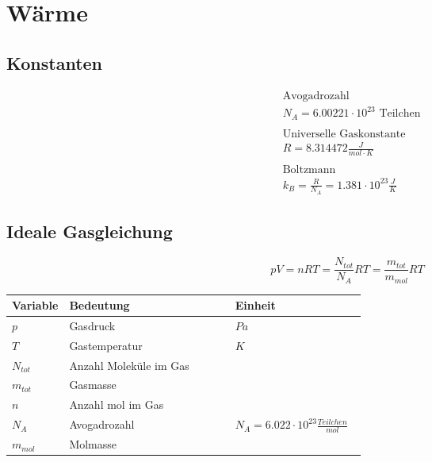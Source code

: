 



\chapter{Wärme}

\section{Konstanten}
\[
\boxed{\begin{aligned}	
		&\text{Avogadrozahl} \\
		&N_{A} = 6.00221 \cdot 10^{23}\text{ Teilchen}\\
		\\
		&\text{Universelle Gaskonstante}\\
		&R = 8.314472 \frac{J}{mol \cdot K}\\
		\\
		&\text{Boltzmann}\\
		&k_{B} = \frac{R}{N_{A}}=1.381 \cdot 10^{23} \frac{J}{K}
	\end{aligned}}	\]

\section{Ideale Gasgleichung}

\[pV = nRT = \frac{N_{tot}}{N_{A}}RT = \frac{m_{tot}}{m_{mol}}RT\]

\begin{tabular*}{\linewidth}{p{0.15\linewidth}lp{0.37\linewidth}}
	\textbf{Variable}				&	\textbf{Bedeutung}		& \textbf{Einheit}\\
	\hline
	\rowcolor{white}$p$			&      Gasdruck				&$Pa$\\
	\rowcolor{lgray}$T$			&	Gastemperatur			& $K$\\
	\rowcolor{white}$N_{tot}$	&	Anzahl Moleküle im Gas	&$ $\\				
	\rowcolor{lgray}$m_{tot}$	&	Gasmasse				&$ $\\
	\rowcolor{white}$n$			&	Anzahl mol im Gas		&$ $\\
	\rowcolor{lgray}$N_{A}$		&	Avogadrozahl			&$N_{A} = 6.022 \cdot 10^{23} \frac{Teilchen}{mol}$\\	
	\rowcolor{white}$m_{mol}$	&	Molmasse				&$ $\\
\end{tabular*}



